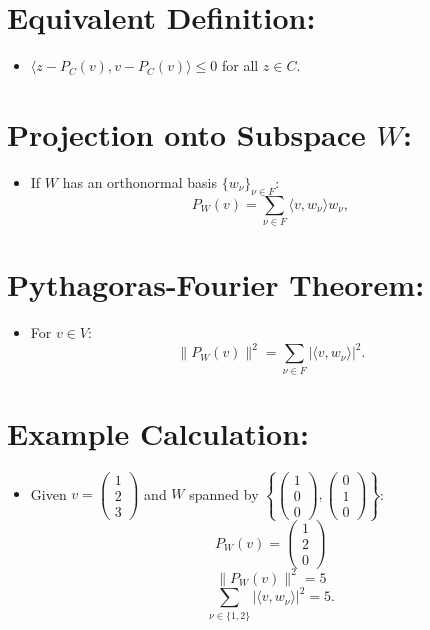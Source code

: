 \documentclass{article}
\begin{document}
\section{Equivalent Definition:}
\begin{itemize}
    \item $\langle z - P_C(v), v - P_C(v) \rangle \leq 0$ for all $z \in C$.
\end{itemize}










\section{Projection onto Subspace \( W \):}
\begin{itemize}
    \item If \( W \) has an orthonormal basis \( \{ w_\nu \}_{\nu \in F} \):
    \[
    P_W(v) = \sum_{\nu \in F} \langle v, w_\nu \rangle w_\nu,
    \]
\end{itemize}

\section{Pythagoras-Fourier Theorem:}
\begin{itemize}
    \item For \( v \in V \):
    \[
    \| P_W(v) \|^2 = \sum_{\nu \in F} |\langle v, w_\nu \rangle|^2.
    \]
\end{itemize}

\section{Example Calculation:}
\begin{itemize}
    \item Given \( v = \begin{pmatrix} 1 \\ 2 \\ 3 \end{pmatrix} \) and \( W \) spanned by \( \left\{ \begin{pmatrix} 1 \\ 0 \\ 0 \end{pmatrix}, \begin{pmatrix} 0 \\ 1 \\ 0 \end{pmatrix} \right\} \):
    \[
    P_W(v) = \begin{pmatrix} 1 \\ 2 \\ 0 \end{pmatrix}
    \]
    \[
    \| P_W(v) \|^2 = 5
    \]
    \[
    \sum_{\nu \in \{1,2\}} |\langle v, w_\nu \rangle|^2 = 5.
    \]
\end{itemize}
\end{document}
